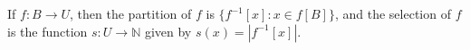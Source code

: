 If $f: B \rightarrow U$, then the partition of $f$ is $\{f^{-1}[x]: x \in f[B]\}$, and the selection of $f$ is the function $s: U \rightarrow \mathbb{N}$ given by $s(x) = |f^{-1}[x]|$.

